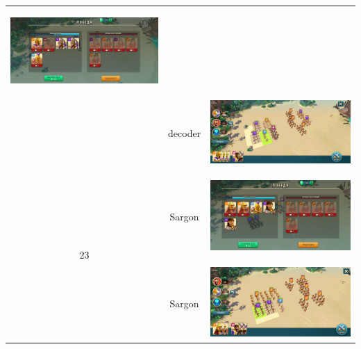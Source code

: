 \begin{longtable}{|c|c|c|}
	\hypertarget{fight22}{\includegraphics[width=0.75\linewidth]{./parts/media/TreasureHunt/22/decoder/photo_2022-04-13_16-27-45.jpg}} \\
	& decoder &
	\includegraphics[width=0.75\linewidth]{./parts/media/TreasureHunt/22/decoder/photo_2022-04-13_16-27-22.jpg} \\
	\hline
	\multirow{8}{*}{23} & Sargon &
	\hypertarget{fight23}{\includegraphics[width=0.75\linewidth]{./parts/media/TreasureHunt/23/sargon/photo_2022-04-06_18-12-26.jpg}} \\
	& Sargon &
	\includegraphics[width=0.75\linewidth]{./parts/media/TreasureHunt/23/sargon/photo_2022-04-06_18-12-18.jpg} \\

\end{longtable}
